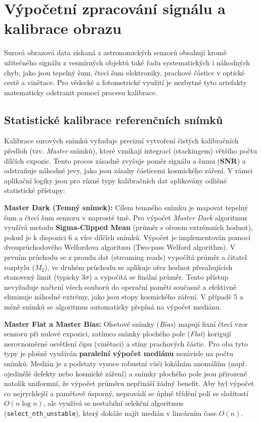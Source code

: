 \chapter{Výpočetní zpracování signálu a kalibrace obrazu}
\label{ch:calibration}

Surová obrazová data získaná z astronomických senzorů obsahují kromě užitečného signálu z vesmírných objektů také řadu systematických i náhodných chyb, jako jsou tepelný šum, čtecí šum elektroniky, prachové částice v optické cestě a vinětace. Pro vědecké a fotometrické využití je nezbytné tyto artefakty matematicky odstranit pomocí procesu kalibrace.

\section{Statistické kalibrace referenčních snímků}
Kalibrace surových snímků vyžaduje precizní vytvoření čistých kalibračních předloh (tzv. \textit{Master} snímků), které vznikají integrací (stackingem) většího počtu dílčích expozic. Tento proces zásadně zvyšuje poměr signálu a šumu (\textbf{\ac{SNR}}) a odstraňuje náhodné jevy, jako jsou zásahy částicemi kosmického záření. V rámci aplikační logiky jsou pro různé typy kalibračních dat aplikovány odlišné statistické přístupy:

\textbf{Master Dark (Temný snímek):}
Cílem temného snímku je mapovat tepelný šum a čtecí šum senzoru v naprosté tmě. Pro výpočet \textit{Master Dark} algoritmus využívá metodu \textbf{Sigma-Clipped Mean} (průměr s ořezem extrémních hodnot), pokud je k dispozici 6 a více dílčích snímků. Výpočet je implementován pomocí dvouprůchodového Welfordova algoritmu (Two-pass Welford algorithm)\cite{welford1962}. V prvním průchodu se z proudu dat (streaming reads) vypočítá průměr a čitatel rozptylu ($M_2$), ve druhém průchodu se aplikuje ořez hodnot přesahujících stanovený limit (typicky 3$\sigma$) a vypočítá se finální průměr. Tento přístup nevyžaduje načtení všech souborů do operační paměti současně a efektivně eliminuje náhodné extrémy, jako jsou stopy kosmického záření. V případě 5 a méně snímků se algoritmus automaticky přepíná na výpočet mediánu.

\textbf{Master Flat a Master Bias:}
Ofsetové snímky (\textit{Bias}) mapují fixní čtecí vzor senzoru při nulové expozici, zatímco snímky plochého pole (\textit{Flat}) korigují nerovnoměrné osvětlení čipu (vinětaci) a stíny prachových částic. Pro oba tyto typy je plošně využíván \textbf{paralelní výpočet mediánu} nezávisle na počtu snímků. Medián je z podstaty vysoce robustní vůči lokálním anomáliím (např. ojedinělé defekty nebo kosmické záření) a snímky plochého pole jsou přirozeně natolik uniformní, že výpočet průměru nepřináší žádný benefit. Aby byl výpočet co nejrychlejší a paměťově úsporný, neprovádí se úplné třídění polí se složitostí $O(n \log n)$, ale využívá se nestabilní selekční algoritmus (\texttt{select\_nth\_unstable}), který dokáže najít medián v lineárním čase $O(n)$. 

